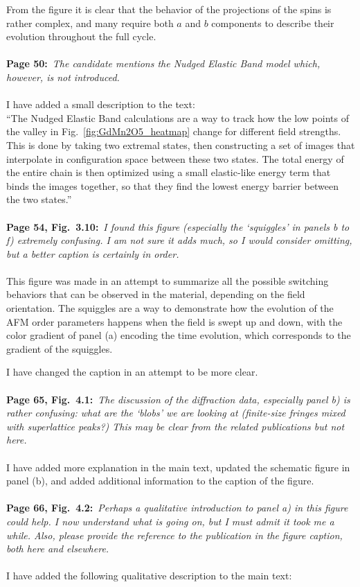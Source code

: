 \documentclass[phd, titlesmallcaps,foronline,oneside]{SNSthesis}
\begin{document}
From the figure it is clear that the behavior of the projections of the spins is rather complex, and many require both $a$ and $b$ components to describe their evolution throughout the full cycle.
\\\\
{\bf Page 50:}~{\it The candidate mentions the Nudged Elastic Band model which, however, is not introduced.}
\\\\
I have added a small description to the text:\\
``The Nudged Elastic Band calculations are a way to track how the low points of the valley in Fig.~\ref{fig:GdMn2O5_heatmap} change for different field strengths.
This is done by taking two extremal states, then constructing a set of images that interpolate in configuration space between these two states. The total energy of the entire chain is then optimized using a small elastic-like energy term that binds the images together, so that they find the lowest energy barrier between the two states.''
\\\\
{\bf Page 54, Fig.~3.10:}~{\it I found this figure (especially the `squiggles' in panels b to f) extremely confusing. I am not sure it adds much, so I would consider omitting, but a better caption is certainly in order.}
\\\\
This figure was made in an attempt to summarize all the possible switching behaviors that can be observed in the material, depending on the field orientation. The squiggles are a way to demonstrate how the evolution of the AFM order parameters happens when the field is swept up and down, with the color gradient of panel (a) encoding the time evolution, which corresponds to the gradient of the squiggles.

I have changed the caption in an attempt to be more clear.
\\\\
{\bf Page 65, Fig.~4.1:}~{\it The discussion of the diffraction data, especially panel b) is rather confusing:
what are the ‘blobs’ we are looking at (finite-size fringes mixed with superlattice peaks?) This may
be clear from the related publications but not here.}
\\\\
I have added more explanation in the main text, updated the schematic figure in panel (b), and added additional information to the caption of the figure.
\\\\
{\bf Page 66, Fig.~4.2:}~{\it Perhaps a qualitative introduction to panel a) in this figure could help. I now understand what is going on, but I must admit it took me a while. Also, please provide the
reference to the publication in the figure caption, both here and elsewhere.}
\\\\
I have added the following qualitative description to the main text:
\end{document}
